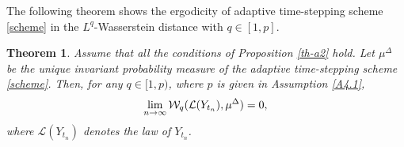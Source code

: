 \documentclass[preprint,12pt,compress]{elsarticle}
\newtheorem{theorem}{Theorem}[section] %
\begin{document}
The following theorem shows the ergodicity of adaptive time-stepping scheme \eqref{scheme} in the $L^q$-Wasserstein distance with $q \in [1,p]$.

\begin{theorem}   \label{th-a4}
Assume that all the conditions of Proposition \ref{th-a2} hold. Let $\mu^\Delta$ be the unique invariant probability measure of the adaptive time-stepping scheme \eqref{scheme}. Then, for any $q \in [1,p)$, where $p$ is given in Assumption \ref{A4.1}, 
\begin{equation*}
	\mathop {\lim }\limits_{n \to \infty } {{\cal W}_q}({\cal L}({Y_{{t_n}}}),{\mu ^\Delta }) = 0,
\end{equation*}
where $\mathcal{L}({Y_{{t_n}}})$ denotes the law of $Y_{t_n}$.
\end{theorem}
\end{document}
